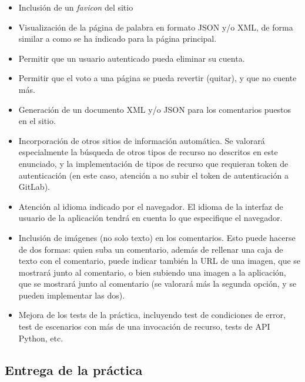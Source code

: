 \begin{itemize}
  \item Inclusión de un \emph{favicon} del sitio
  
  \item Visualización de la página de palabra en formato JSON y/o XML, de forma similar a como se ha indicado para la página principal.

  \item Permitir que un usuario autenticado pueda eliminar su cuenta.

  \item Permitir que el voto a una página se pueda revertir (quitar), y que no cuente más.

  \item Generación de un documento XML y/o JSON para los comentarios puestos en el sitio.

  \item Incorporación de otros sitios de información automática. Se valorará especialmente la búsqueda de otros tipos de recurso no descritos en este enunciado, y la implementación de tipos de recurso que requieran token de autenticación (en este caso, atención a no subir el token de autenticación a GitLab).
 
  \item Atención al idioma indicado por el navegador. El idioma de la interfaz de usuario de la aplicación tendrá en cuenta lo que especifique el navegador.

  \item Inclusión de imágenes (no solo texto) en los comentarios. Esto puede hacerse de dos formas: quien suba un comentario, además de rellenar una caja de texto con el comentario, puede indicar también la URL de una imagen, que se mostrará junto al comentario, o bien subiendo una imagen a la aplicación, que se mostrará junto al comentario (se valorará más la segunda opción, y se pueden implementar las dos).
    
  \item Mejora de los tests de la práctica, incluyendo test de condiciones de error, test de escenarios con más de una invocación de recurso, tests de API Python, etc.
\end{itemize}

\subsection{Entrega de la práctica}

